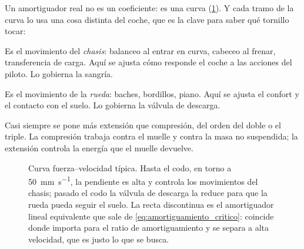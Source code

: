 Un amortiguador real no es un coeficiente: es una curva
(\cref{fig:muelles:amortiguador}). Y cada tramo de la curva lo usa una cosa
distinta del coche, que es la clave para saber qué tornillo tocar:

\begin{description}[leftmargin=0pt,labelsep=0pt,style=nextline]
  \item[Baja velocidad (hasta \SI{50}{\milli\meter\per\second})] Es el
    movimiento del \emph{chasis}: balanceo al entrar en curva, cabeceo al
    frenar, transferencia de carga. Aquí se ajusta cómo responde el coche a las
    acciones del piloto. Lo gobierna la sangría.
  \item[Alta velocidad (por encima del codo)] Es el movimiento de la
    \emph{rueda}: baches, bordillos, piano. Aquí se ajusta el confort y el
    contacto con el suelo. Lo gobierna la válvula de descarga.
  \item[Compresión frente a extensión] Casi siempre se pone más extensión que
    compresión, del orden del doble o el triple. La compresión trabaja contra
    el muelle y contra la masa no suspendida; la extensión controla la energía
    que el muelle devuelve.
\end{description}

\begin{figure}[htbp]
\centering
{}
\caption[Curva fuerza--velocidad de un amortiguador]{Curva fuerza--velocidad
típica. Hasta el codo, en torno a \SI{50}{\milli\meter\per\second}, la pendiente
es alta y controla los movimientos del chasis; pasado el codo la válvula de
descarga la reduce para que la rueda pueda seguir el suelo. La recta discontinua
es el amortiguador lineal equivalente que sale de
\eqref{eq:amortiguamiento_critico}: coincide donde importa para el ratio de
amortiguamiento y se separa a alta velocidad, que es justo lo que se busca.}
\label{fig:muelles:amortiguador}
\end{figure}

